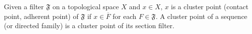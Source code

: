 Given a filter $\mathfrak{F}$ on a topological space $X$ and $x \in X$, $x$ is a cluster point (contact point, adherent point) of $\mathfrak{F}$ if $x \in \overline{F}$ for each $F \in \mathfrak{F}$. A cluster point of a sequence (or directed family) is a cluster point of its section filter.
